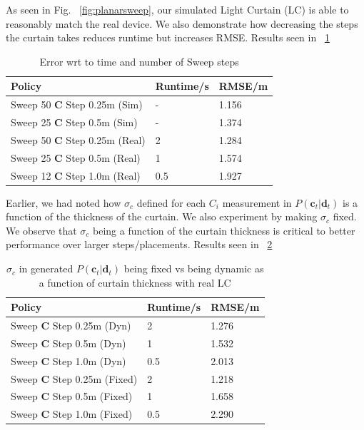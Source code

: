 As seen in Fig. ~\ref{fig:planarsweep}, our simulated Light Curtain (LC) is able to reasonably match the real device. We also demonstrate how decreasing the steps the curtain takes reduces runtime but increases RMSE. Results seen in ~\ref{table:t1}

\begin{table}[h]
   \centering
   \begin{tabular}{|l|l|l|}
   \hline
    Policy&  Runtime/s&  RMSE/m\\ \hline
    Sweep 50 $\mathbf{C}$ Step 0.25m (Sim) &-  &1.156  \\ \hline
    Sweep 25 $\mathbf{C}$ Step 0.5m  (Sim) &-  &1.374  \\ \hline
    Sweep 50 $\mathbf{C}$ Step 0.25m (Real) &2  &1.284  \\ \hline
    Sweep 25 $\mathbf{C}$ Step 0.5m  (Real) &1  &1.574  \\ \hline
    Sweep 12 $\mathbf{C}$ Step 1.0m (Real) &0.5  &1.927  \\ \hline
   \end{tabular}
   \caption{Error wrt to time and number of Sweep steps}
   \label{table:t1}
\end{table}

Earlier, we had noted how $\sigma_{c}$ defined for each $C_{i}$ measurement in $P\left(\mathbf{c}_{t}|\mathbf{d}_{t}\right)$ is a function of the thickness of the curtain. We also experiment by making $\sigma_{c}$ fixed. We observe that $\sigma_{c}$ being a function of the curtain thickness is critical to better performance over larger steps/placements. Results seen in ~\ref{table:t2}

\begin{table}[h]
   \centering
   \begin{tabular}{|l|l|l|}
   \hline
    Policy&  Runtime/s&  RMSE/m\\ \hline
    Sweep $\mathbf{C}$ Step 0.25m (Dyn) &2  &1.276  \\ \hline
    Sweep $\mathbf{C}$ Step 0.5m  (Dyn) &1  &1.532  \\ \hline
    Sweep $\mathbf{C}$ Step 1.0m (Dyn) &0.5  &2.013  \\ \hline
    Sweep $\mathbf{C}$ Step 0.25m (Fixed) &2  &1.218  \\ \hline
    Sweep $\mathbf{C}$ Step 0.5m  (Fixed) &1  &1.658  \\ \hline
    Sweep $\mathbf{C}$ Step 1.0m (Fixed) &0.5  &2.290  \\ \hline
   \end{tabular}
   \caption{$\sigma_{c}$ in generated $P\left(\mathbf{c}_{t}|\mathbf{d}_{t}\right)$ being fixed vs being dynamic as a function of curtain thickness with real LC}
   \label{table:t2}
\end{table}

